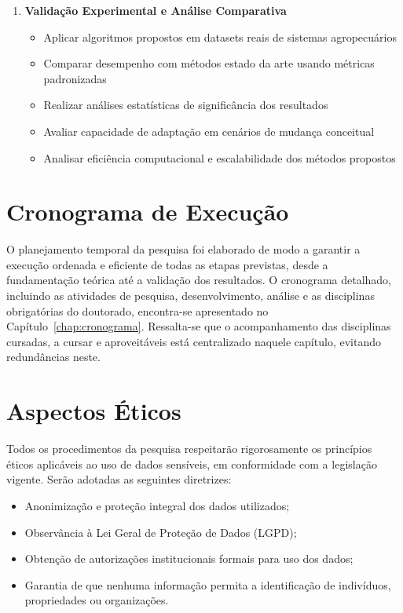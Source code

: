 \begin{enumerate}
\item \textbf{Validação Experimental e Análise Comparativa}
\begin{itemize}
\item Aplicar algoritmos propostos em datasets reais de sistemas agropecuários
\item Comparar desempenho com métodos estado da arte usando métricas padronizadas
\item Realizar análises estatísticas de significância dos resultados
\item Avaliar capacidade de adaptação em cenários de mudança conceitual
\item Analisar eficiência computacional e escalabilidade dos métodos propostos
\end{itemize}
\end{enumerate}


\section{Cronograma de Execução}

O planejamento temporal da pesquisa foi elaborado de modo a garantir a execução ordenada e eficiente de todas as etapas previstas, desde a fundamentação teórica até a validação dos resultados. O cronograma detalhado, incluindo as atividades de pesquisa, desenvolvimento, análise e as disciplinas obrigatórias do doutorado, encontra-se apresentado no Capítulo~\ref{chap:cronograma}. Ressalta-se que o acompanhamento das disciplinas cursadas, a cursar e aproveitáveis está centralizado naquele capítulo, evitando redundâncias neste.


\section{Aspectos Éticos}

Todos os procedimentos da pesquisa respeitarão rigorosamente os princípios éticos aplicáveis ao uso de dados sensíveis, em conformidade com a legislação vigente. Serão adotadas as seguintes diretrizes:
\begin{itemize}
    \item Anonimização e proteção integral dos dados utilizados;
    \item Observância à Lei Geral de Proteção de Dados (LGPD);
    \item Obtenção de autorizações institucionais formais para uso dos dados;
    \item Garantia de que nenhuma informação permita a identificação de indivíduos, propriedades ou organizações.
\end{itemize}


